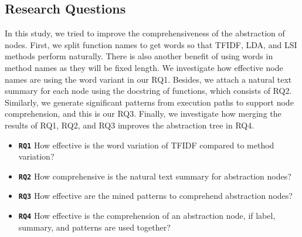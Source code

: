 \subsection{Research Questions}
In this study, we tried to improve the comprehensiveness of the abstraction of nodes. First, we split function names to get words so that TFIDF, LDA, and LSI methods perform naturally. There is also another benefit of using words in method names as they will be fixed length. We investigate how effective node names are using the word variant in our RQ1. Besides, we attach a natural text summary for each node using the docstring of functions, which consists of RQ2. Similarly, we generate significant patterns from execution paths to support node comprehension, and this is our RQ3. Finally, we investigate how merging the results of RQ1, RQ2, and RQ3 improves the abstraction tree in RQ4. 

\begin{itemize}
    
    \item \textbf{\texttt{RQ1}} How effective is the word variation of TFIDF compared to method variation?
    \item \textbf{\texttt{RQ2}} How comprehensive is the natural text summary for abstraction nodes?
    \item \textbf{\texttt{RQ3}} How effective are the mined patterns to comprehend abstraction nodes?
    \item \textbf{\texttt{RQ4}} How effective is the comprehension of an abstraction node, if label, summary, and patterns are used together?
\end{itemize}

